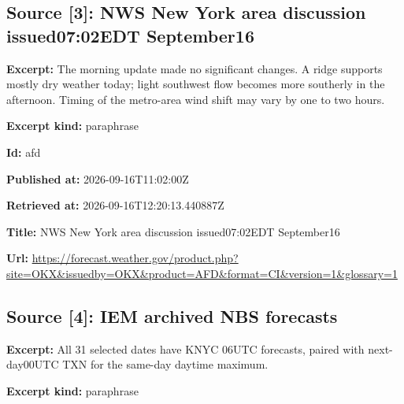 \documentclass[11pt]{article}
\begin{document}
\subsection*{\textcolor{epdarkgreen}{Source [3]: NWS New York area discussion issued07:02EDT September16}}
\par\noindent\textbf{Excerpt:} The morning update made no significant changes. A ridge supports mostly dry weather today; light southwest flow becomes more southerly in the afternoon. Timing of the metro-area wind shift may vary by one to two hours.

\par\noindent\textbf{Excerpt kind:} paraphrase

\par\noindent\textbf{Id:} afd

\par\noindent\textbf{Published at:} 2026-09-16T11:02:00Z

\par\noindent\textbf{Retrieved at:} 2026-09-16T12:20:13.440887Z

\par\noindent\textbf{Title:} NWS New York area discussion issued07:02EDT September16

\par\noindent\textbf{Url:} \href{https://forecast.weather.gov/product.php?site=OKX\&issuedby=OKX\&product=AFD\&format=CI\&version=1\&glossary=1}{https://fore\hspace{0pt}cast.weather\hspace{0pt}.gov/product\hspace{0pt}.php?site=OK\hspace{0pt}X\&issuedby=O\hspace{0pt}KX\&product=A\hspace{0pt}FD\&format=CI\hspace{0pt}\&version=1\&g\hspace{0pt}lossary=1}

\subsection*{\textcolor{epdarkgreen}{Source [4]: IEM archived NBS forecasts}}
\par\noindent\textbf{Excerpt:} All 31 selected dates have KNYC 06UTC forecasts, paired with next-day00UTC TXN for the same-day daytime maximum.

\par\noindent\textbf{Excerpt kind:} paraphrase
\end{document}
